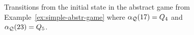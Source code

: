 \begin{itemize}
%
%
%
\end{itemize}

\begin{figure}

\caption{Transitions from the initial state in the abstract game from Example~\ref{ex:simple-abstr-game} where $\alpha_{\mathcal{Q}}(17) = Q_4$ and $\alpha_{\mathcal{Q}}(23) = Q_5$.}
\label{fig:simple-abstr-game}
\vspace{-.7cm}
\end{figure}


